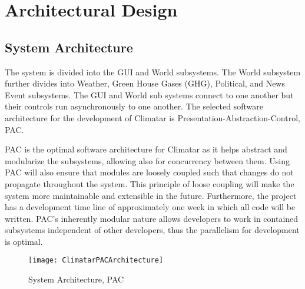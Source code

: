 \documentclass[]{article}
\begin{document}


\section{Architectural Design}
\label{sec:architectural_design}

\subsection{System Architecture}
\label{sub:system_architecture}

The system is divided into the GUI and World subsystems. The World subsystem further divides into Weather, Green House Gases (GHG), Political, and News Event subsystems. The GUI and World sub systems connect to one another but their controls run asynchronously to one another. The selected software architecture for the development of Climatar is Presentation-Abstraction-Control, PAC. 

\vspace{3mm}

PAC is the optimal software architecture for Climatar as it helps abstract and modularize the subsystems, allowing also for concurrency between them. Using PAC will also ensure that modules are loosely coupled such that changes do not propagate throughout the system. This principle of loose coupling will make the system more maintainable and extensible in the future. Furthermore, the project has a development time line of approximately one week in which all code will be written. PAC's inherently modular nature allows developers to work in contained subsystems independent of other developers, thus the parallelism for development is optimal.

\begin{figure}[ht!]
\centering
\texttt{[image: ClimatarPACArchitecture]}
\caption{System Architecture, PAC\label{pacarch}}
\end{figure}

\end{document}
